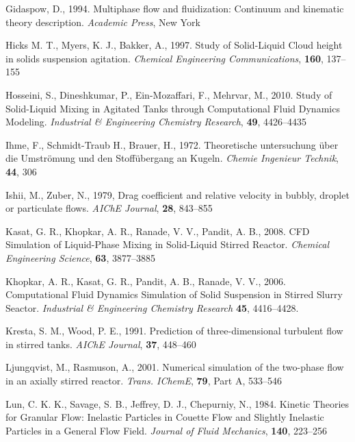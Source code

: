 \begin{thebibliography}{99}
 Gidaspow, D., 1994. Multiphase flow and fluidization: Continuum and kinematic theory description. \textit{Academic Press}, New York

 Hicks M. T., Myers, K. J.,  Bakker, A., 1997. Study of Solid-Liquid Cloud height in solids suspension agitation. \textit{Chemical Engineering Communications}, \textbf{160}, 137--155

 Hosseini, S., Dineshkumar, P., Ein-Mozaffari, F., Mehrvar, M., 2010. Study of Solid-Liquid Mixing in Agitated Tanks through Computational Fluid Dynamics Modeling. \textit{Industrial \& Engineering Chemistry Research}, \textbf{49}, 4426--4435

 Ihme, F., Schmidt-Traub H., Brauer, H., 1972. Theoretische untersuchung \"uber die Umstr\"omung und den Stoff\"ubergang an Kugeln. \textit{Chemie Ingenieur Technik}, \textbf{44}, 306

 Ishii, M., Zuber, N., 1979, Drag coefficient and relative velocity in bubbly, droplet or particulate flows. \textit{AIChE Journal}, \textbf{28}, 843--855 

 Kasat, G. R., Khopkar, A. R., Ranade, V. V., Pandit, A. B., 2008. CFD Simulation of Liquid-Phase Mixing in Solid-Liquid Stirred Reactor. \textit{Chemical Engineering Science}, \textbf{63}, 3877--3885

 Khopkar, A. R., Kasat, G. R., Pandit, A. B., Ranade, V. V., 2006. Computational Fluid Dynamics Simulation of Solid Suspension in Stirred Slurry Seactor. \textit{Industrial \& Engineering Chemistry Research} \textbf{45}, 4416--4428.

 Kresta, S. M., Wood, P. E., 1991. Prediction of three-dimensional turbulent flow in stirred tanks. \textit{AIChE Journal}, \textbf{37}, 448--460 

 Ljungqvist, M., Rasmuson, A., 2001. Numerical simulation of the two-phase flow in an axially stirred reactor. \textit{Trans. IChemE}, \textbf{79}, Part A, 533--546

 Lun, C. K. K., Savage, S. B., Jeffrey, D. J., Chepurniy, N., 1984. Kinetic Theories for Granular Flow: Inelastic Particles in Couette Flow and Slightly Inelastic Particles in a General Flow Field. \textit{Journal of Fluid Mechanics}, \textbf{140}, 223--256 


\end{thebibliography}
